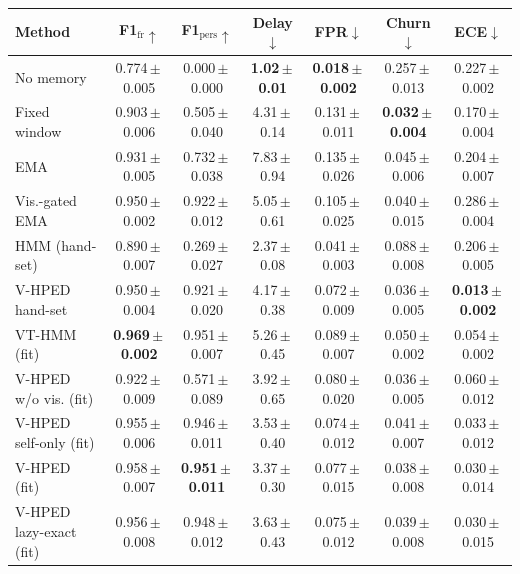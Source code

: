 \begin{tabular}{@{}lcccccc@{}}
\toprule
Method & F1$_{\mathrm{fr}}\uparrow$ & F1$_{\mathrm{pers}}\uparrow$ & Delay$\downarrow$ & FPR$\downarrow$ & Churn$\downarrow$ & ECE$\downarrow$ \\
\midrule
No memory & 0.774\,$\pm$\,0.005 & 0.000\,$\pm$\,0.000 & \textbf{1.02\,$\pm$\,0.01} & \textbf{0.018\,$\pm$\,0.002} & 0.257\,$\pm$\,0.013 & 0.227\,$\pm$\,0.002 \\
Fixed window & 0.903\,$\pm$\,0.006 & 0.505\,$\pm$\,0.040 & 4.31\,$\pm$\,0.14 & 0.131\,$\pm$\,0.011 & \textbf{0.032\,$\pm$\,0.004} & 0.170\,$\pm$\,0.004 \\
EMA & 0.931\,$\pm$\,0.005 & 0.732\,$\pm$\,0.038 & 7.83\,$\pm$\,0.94 & 0.135\,$\pm$\,0.026 & 0.045\,$\pm$\,0.006 & 0.204\,$\pm$\,0.007 \\
Vis.-gated EMA & 0.950\,$\pm$\,0.002 & 0.922\,$\pm$\,0.012 & 5.05\,$\pm$\,0.61 & 0.105\,$\pm$\,0.025 & 0.040\,$\pm$\,0.015 & 0.286\,$\pm$\,0.004 \\
HMM (hand-set) & 0.890\,$\pm$\,0.007 & 0.269\,$\pm$\,0.027 & 2.37\,$\pm$\,0.08 & 0.041\,$\pm$\,0.003 & 0.088\,$\pm$\,0.008 & 0.206\,$\pm$\,0.005 \\
V-HPED hand-set & 0.950\,$\pm$\,0.004 & 0.921\,$\pm$\,0.020 & 4.17\,$\pm$\,0.38 & 0.072\,$\pm$\,0.009 & 0.036\,$\pm$\,0.005 & \textbf{0.013\,$\pm$\,0.002} \\
VT-HMM (fit) & \textbf{0.969\,$\pm$\,0.002} & 0.951\,$\pm$\,0.007 & 5.26\,$\pm$\,0.45 & 0.089\,$\pm$\,0.007 & 0.050\,$\pm$\,0.002 & 0.054\,$\pm$\,0.002 \\
V-HPED w/o vis. (fit) & 0.922\,$\pm$\,0.009 & 0.571\,$\pm$\,0.089 & 3.92\,$\pm$\,0.65 & 0.080\,$\pm$\,0.020 & 0.036\,$\pm$\,0.005 & 0.060\,$\pm$\,0.012 \\
V-HPED self-only (fit) & 0.955\,$\pm$\,0.006 & 0.946\,$\pm$\,0.011 & 3.53\,$\pm$\,0.40 & 0.074\,$\pm$\,0.012 & 0.041\,$\pm$\,0.007 & 0.033\,$\pm$\,0.012 \\
V-HPED (fit) & 0.958\,$\pm$\,0.007 & \textbf{0.951\,$\pm$\,0.011} & 3.37\,$\pm$\,0.30 & 0.077\,$\pm$\,0.015 & 0.038\,$\pm$\,0.008 & 0.030\,$\pm$\,0.014 \\
V-HPED lazy-exact (fit) & 0.956\,$\pm$\,0.008 & 0.948\,$\pm$\,0.012 & 3.63\,$\pm$\,0.43 & 0.075\,$\pm$\,0.012 & 0.039\,$\pm$\,0.008 & 0.030\,$\pm$\,0.015 \\
\bottomrule
\end{tabular}
